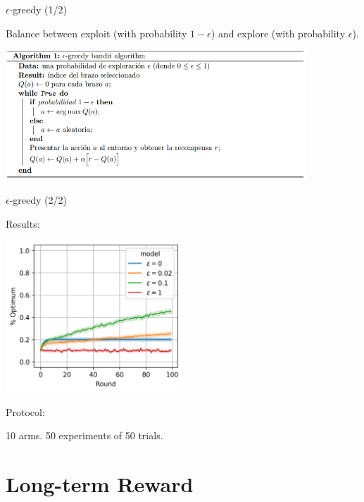 \documentclass[11pt]{beamer}
\begin{document}
\begin{frame}{$\epsilon$-greedy (1/2)}

Balance between exploit (with probability $1-\epsilon$) and explore (with probability $\epsilon$).

\begin{center}
\includegraphics[width=0.85\textwidth]{images/e-greedy}
\end{center}

\end{frame}

\begin{frame}{$\epsilon$-greedy (2/2)}

Results:

\vspace{-\baselineskip}

\begin{center}
\includegraphics[width=0.5\textwidth]{images/e-greedys}
\end{center}

\vspace{-\baselineskip}

Protocol:

10 arms. 50 experiments of 50 trials.

\end{frame}


\section{Long-term Reward}
\end{document}
